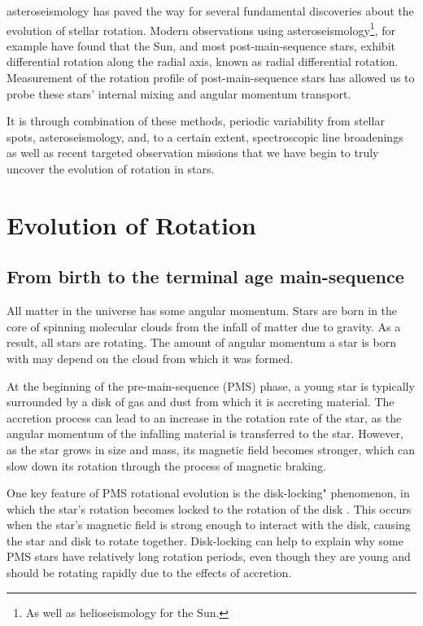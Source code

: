 asteroseismology has paved the way for several fundamental discoveries about the evolution of stellar rotation.
Modern observations using asteroseismology\footnote{As well as helioseismology for the Sun.}, for example have found that the Sun, and most post-main-sequence stars, exhibit differential rotation along the radial axis, known as radial differential rotation.
Measurement of the rotation profile of post-main-sequence stars has allowed us to probe these stars' internal mixing and angular momentum transport. 

It is through combination of these methods, periodic variability from stellar spots, asteroseismology, and, to a certain extent, spectroscopic line broadenings as well as recent targeted observation missions that we have begin to truly uncover the evolution of rotation in stars.

\section{Evolution of Rotation}
\label{sec:evolution}


\subsection{From birth to the terminal age main-sequence}

All matter in the universe has some angular momentum. 
Stars are born in the core of spinning molecular clouds from the infall of matter due to gravity. 
As a result, all stars are rotating.
The amount of angular momentum a star is born with may depend on the cloud from which it was formed.

At the beginning of the pre-main-sequence (PMS) phase, a young star is typically surrounded by a disk of gas and dust from which it is accreting material.
The accretion process can lead to an increase in the rotation rate of the star, as the angular momentum of the infalling material is transferred to the star.
However, as the star grows in size and mass, its magnetic field becomes stronger, which can slow down its rotation through the process of magnetic braking.

One key feature of PMS rotational evolution is the disk-locking" phenomenon, in which the star's rotation becomes locked to the rotation of the disk \citep{eggenberger_angular_2012}.
This occurs when the star's magnetic field is strong enough to interact with the disk, causing the star and disk to rotate together.
Disk-locking can help to explain why some PMS stars have relatively long rotation periods, even though they are young and should be rotating rapidly due to the effects of accretion.

